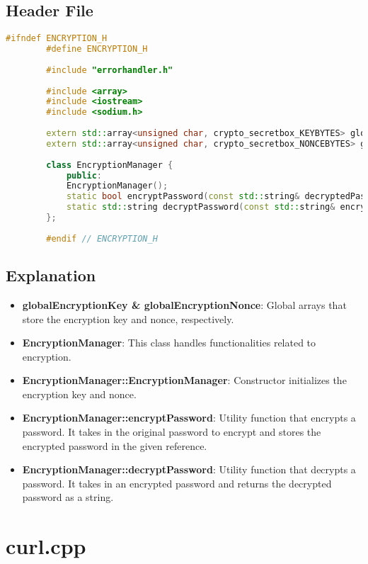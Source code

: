 \documentclass{article}
\begin{document}
	\subsection*{Header File}
	\begin{lstlisting}[language=C++]
		#ifndef ENCRYPTION_H
		#define ENCRYPTION_H
		
		#include "errorhandler.h"
		
		#include <array>
		#include <iostream>
		#include <sodium.h>
		
		extern std::array<unsigned char, crypto_secretbox_KEYBYTES> globalEncryptionKey;
		extern std::array<unsigned char, crypto_secretbox_NONCEBYTES> globalEncryptionNonce;
		
		class EncryptionManager {
			public:
			EncryptionManager();
			static bool encryptPassword(const std::string& decryptedPassword, std::string& encryptedPassword);
			static std::string decryptPassword(const std::string& encryptedPassword);
		};
		
		#endif // ENCRYPTION_H
	\end{lstlisting}
	
	\subsection*{Explanation}
	\begin{itemize}
		\item \textbf{globalEncryptionKey \& globalEncryptionNonce}: Global arrays that store the encryption key and nonce, respectively.
		\item \textbf{EncryptionManager}: This class handles functionalities related to encryption.
		\item \textbf{EncryptionManager::EncryptionManager}: Constructor initializes the encryption key and nonce.
		\item \textbf{EncryptionManager::encryptPassword}: Utility function that encrypts a password. It takes in the original password to encrypt and stores the encrypted password in the given reference.
		\item \textbf{EncryptionManager::decryptPassword}: Utility function that decrypts a password. It takes in an encrypted password and returns the decrypted password as a string.
	\end{itemize}
	
	\section{curl.cpp}
	
\end{document}
